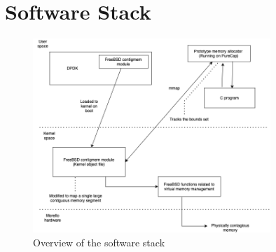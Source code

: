 

\section{Software Stack}
\begin{figure}[h]
\includegraphics[width=0.8\textwidth]{diagrams/SoftwareStack24.png}
\caption{Overview of the software stack}
\label{fig:SoftwareStack}
\end{figure}


